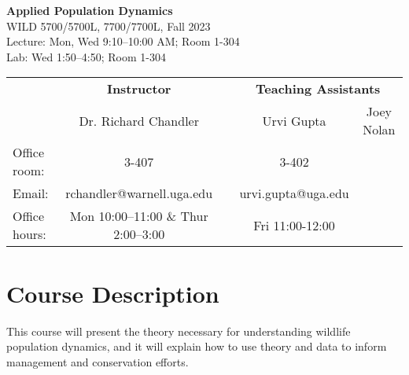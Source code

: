\documentclass[12pt]{article}
\begin{document}

{\centering

{\Large
  \bf \sc
  Applied Population Dynamics \\}
  WILD 5700/5700L, 7700/7700L, Fall 2023  \\
  Lecture: Mon, Wed 9:10--10:00 AM; Room 1-304 \\
  Lab: Wed 1:50--4:50; Room 1-304 \\


\normalsize

\vspace{0.5cm}

{\small
\begin{tabular}[h!]{lcccc}
                     & \textbf{Instructor}                   & \hspace{0.01cm} & \multicolumn{2}{c}{\textbf{Teaching Assistants}} \\
                     & Dr. Richard Chandler                  &                 & Urvi Gupta         & Joey Nolan                  \\
Office room:         & 3-407                                 &                 & 3-402              &                             \\
Email:               & rchandler@warnell.uga.edu             &                 & urvi.gupta@uga.edu &                             \\
Office hours:        & Mon 10:00--11:00 \& Thur 2:00--3:00 &                 & Fri 11:00-12:00    &                             \\
\end{tabular}
}

}



\normalsize


\vspace{-3mm}
\section*{\normalsize Course Description}
\vspace{-4mm}
This course will present the theory necessary for understanding
wildlife population dynamics, and it will explain how to use theory
and data to inform management and conservation efforts.
\end{document}
